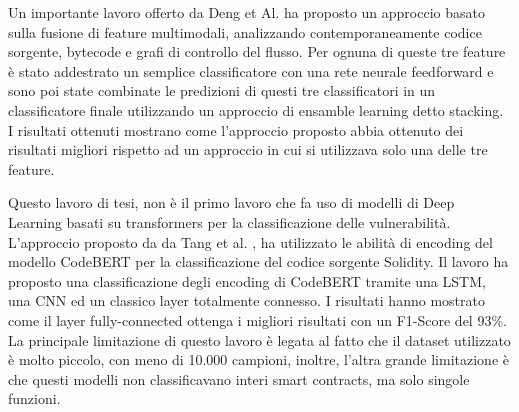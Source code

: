 \documentclass[../../Thesis.tex]{subfiles}
\begin{document}
Un importante lavoro offerto da Deng et Al. \cite{Deng} ha proposto un approccio basato sulla fusione di feature multimodali, analizzando contemporaneamente codice sorgente, bytecode e grafi di controllo del flusso. Per ognuna di queste tre feature è stato addestrato un semplice classificatore con una rete neurale feedforward e sono poi state combinate le predizioni di questi tre classificatori in un classificatore finale utilizzando un approccio di ensamble learning detto stacking. I risultati ottenuti mostrano come l'approccio proposto abbia ottenuto dei risultati migliori rispetto ad un approccio in cui si utilizzava solo una delle tre feature.

Questo lavoro di tesi, non è il primo lavoro che fa uso di modelli di Deep Learning basati su transformers per la classificazione delle vulnerabilità. L'approccio proposto da da Tang et al. \cite{CodeBERTPaper}, ha utilizzato le abilità di encoding del modello CodeBERT per la classificazione del codice sorgente Solidity. Il lavoro ha proposto una classificazione degli encoding di CodeBERT tramite una LSTM, una CNN ed un classico layer totalmente connesso. I risultati hanno mostrato come il layer fully-connected ottenga i migliori risultati con un F1-Score del 93\%. La principale limitazione di questo lavoro è legata al fatto che il dataset utilizzato è molto piccolo, con meno di 10.000 campioni, inoltre, l'altra grande limitazione è che questi modelli non classificavano interi smart contracts, ma solo singole funzioni.
\end{document}
